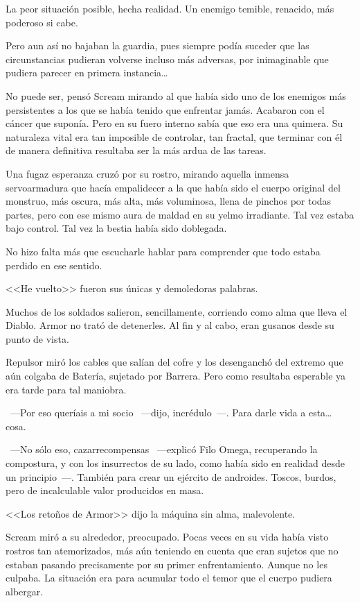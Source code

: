La peor situación posible, hecha realidad. Un enemigo temible, renacido, más poderoso si cabe.

Pero aun así no bajaban la guardia, pues siempre podía suceder que las circunstancias pudieran volverse incluso más adversas, por inimaginable que pudiera parecer en primera instancia…

\fancyparbreak
No puede ser, pensó Scream mirando al que había sido uno de los enemigos más persistentes a los que se había tenido que enfrentar jamás. Acabaron con el cáncer que suponía. Pero en su fuero interno sabía que eso era una quimera. Su naturaleza vital era tan imposible de controlar, tan fractal, que terminar con él de manera definitiva resultaba ser la más ardua de las tareas.

Una fugaz esperanza cruzó por su rostro, mirando aquella inmensa servoarmadura que hacía empalidecer a la que había sido el cuerpo original del monstruo, más oscura, más alta, más voluminosa, llena de pinchos por todas partes, pero con ese mismo aura de maldad en su yelmo irradiante. Tal vez estaba bajo control. Tal vez la bestia había sido doblegada.

No hizo falta más que escucharle hablar para comprender que todo estaba perdido en ese sentido.

<<He vuelto>> fueron sus únicas y demoledoras palabras.

Muchos de los soldados salieron, sencillamente, corriendo como alma que lleva el Diablo. Armor no trató de detenerles. Al fin y al cabo, eran gusanos desde su punto de vista.

Repulsor miró los cables que salían del cofre y los desenganchó del extremo que aún colgaba de Batería, sujetado por Barrera. Pero como resultaba esperable ya era tarde para tal maniobra.

~---Por eso queríais a mi socio ~---dijo, incrédulo~---. Para darle vida a esta… cosa.

~---No sólo eso, cazarrecompensas ~---explicó Filo Omega, recuperando la compostura, y con los insurrectos de su lado, como había sido en realidad desde un principio~---. También para crear un ejército de androides. Toscos, burdos, pero de incalculable valor producidos en masa.

<<Los retoños de Armor>> dijo la máquina sin alma, malevolente.

Scream miró a su alrededor, preocupado. Pocas veces en su vida había visto rostros tan atemorizados, más aún teniendo en cuenta que eran sujetos que no estaban pasando precisamente por su primer enfrentamiento. Aunque no les culpaba. La situación era para acumular todo el temor que el cuerpo pudiera albergar.


